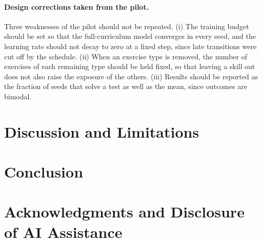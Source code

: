 \documentclass[11pt]{article}
\begin{document}
\paragraph{Design corrections taken from the pilot.}
Three weaknesses of the pilot should not be repeated.
(i) The training budget should be set so that the full-curriculum model converges in every seed, and the learning rate should not decay to zero at a fixed step, since late transitions were cut off by the schedule.
(ii) When an exercise type is removed, the number of exercises of each remaining type should be held fixed, so that leaving a skill out does not also raise the exposure of the others.
(iii) Results should be reported as the fraction of seeds that solve a test as well as the mean, since outcomes are bimodal.

\section{Discussion and Limitations}
\label{sec:limitations}



\section{Conclusion}



\section*{Acknowledgments and Disclosure of AI Assistance}





\appendix

\end{document}
